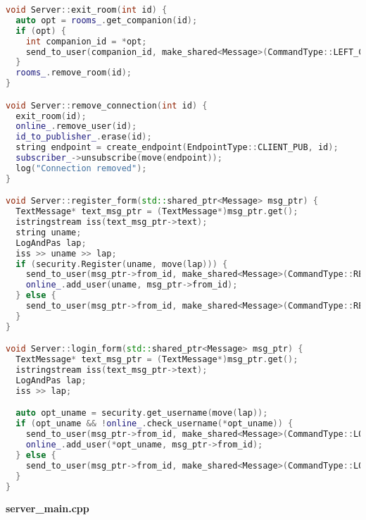 \begin{lstlisting}[language=C++]
void Server::exit_room(int id) {
  auto opt = rooms_.get_companion(id);
  if (opt) {
    int companion_id = *opt;
    send_to_user(companion_id, make_shared<Message>(CommandType::LEFT_CHAT, 0, companion_id, 0));
  }
  rooms_.remove_room(id);
}

void Server::remove_connection(int id) {
  exit_room(id);
  online_.remove_user(id);
  id_to_publisher_.erase(id);
  string endpoint = create_endpoint(EndpointType::CLIENT_PUB, id);
  subscriber_->unsubscribe(move(endpoint));
  log("Connection removed");
}

void Server::register_form(std::shared_ptr<Message> msg_ptr) {
  TextMessage* text_msg_ptr = (TextMessage*)msg_ptr.get();
  istringstream iss(text_msg_ptr->text);
  string uname;
  LogAndPas lap;
  iss >> uname >> lap;
  if (security.Register(uname, move(lap))) {
    send_to_user(msg_ptr->from_id, make_shared<Message>(CommandType::REGISTER, 0, msg_ptr->from_id, 1));
    online_.add_user(uname, msg_ptr->from_id);
  } else {
    send_to_user(msg_ptr->from_id, make_shared<Message>(CommandType::REGISTER, 0, msg_ptr->from_id, 0));
  }
}

void Server::login_form(std::shared_ptr<Message> msg_ptr) {
  TextMessage* text_msg_ptr = (TextMessage*)msg_ptr.get();
  istringstream iss(text_msg_ptr->text);
  LogAndPas lap;
  iss >> lap;

  auto opt_uname = security.get_username(move(lap));
  if (opt_uname && !online_.check_username(*opt_uname)) {
    send_to_user(msg_ptr->from_id, make_shared<Message>(CommandType::LOGIN, 0, msg_ptr->from_id, 1));
    online_.add_user(*opt_uname, msg_ptr->from_id);
  } else {
    send_to_user(msg_ptr->from_id, make_shared<Message>(CommandType::LOGIN, 0, msg_ptr->from_id, 0));
  }
}

\end{lstlisting}

\textbf{server\_main.cpp}

